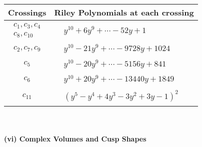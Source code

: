 \documentclass[1p]{elsarticle_modified}
\theoremstyle{definition}
\begin{document}
\begin{tabular}{m{50pt}|m{274pt}}
Crossings & \hspace{64pt}Riley Polynomials at each crossing \\
\hline $$\begin{aligned}c_{1},c_{3},c_{4}\\c_{8},c_{10}\end{aligned}$$&$\begin{aligned}
&y^{10}+6 y^9+\cdots-52 y+1
\end{aligned}$\\
\hline $$\begin{aligned}c_{2},c_{7},c_{9}\end{aligned}$$&$\begin{aligned}
&y^{10}-21 y^9+\cdots-9728 y+1024
\end{aligned}$\\
\hline $$\begin{aligned}c_{5}\end{aligned}$$&$\begin{aligned}
&y^{10}-20 y^9+\cdots-5156 y+841
\end{aligned}$\\
\hline $$\begin{aligned}c_{6}\end{aligned}$$&$\begin{aligned}
&y^{10}+20 y^9+\cdots-13440 y+1849
\end{aligned}$\\
\hline $$\begin{aligned}c_{11}\end{aligned}$$&$\begin{aligned}
&(y^5- y^4+4 y^3-3 y^2+3 y-1)^2
\end{aligned}$\\
\hline
\end{tabular}\\~\\
\newpage\flushleft \textbf{(vi) Complex Volumes and Cusp Shapes}
\end{document}
